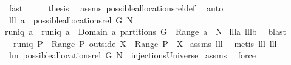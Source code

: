 \begin{isabellebody}
\ fast\isanewline
\ \ \isamarkupfalse%
\ \isamarkupfalse%
\ {\isacharquery}thesis\ \isamarkupfalse%
\ assms{\isacharparenleft}{}{\isacharparenright}\ possible{\isacharunderscore}allocations{\isacharunderscore}rel{\isacharunderscore}def\ \isamarkupfalse%
\ auto\isanewline
{}\isamarkupfalse%
%
\endisatagproof
{\isafoldproof}%
%
\isadelimproof
\isanewline
%
\endisadelimproof
\isanewline
{}\isamarkupfalse%
\ lll{}{}{\isacharcolon}\ {\isachardoublequoteopen}a\ {\isasymin}\ possible{\isacharunderscore}allocations{\isacharunderscore}rel\ G\ N\ {\isasymlongleftrightarrow}\isanewline
runiq\ a\ {\isacharampersand}\ runiq\ {\isacharparenleft}a{\isasyminverse}{\isacharparenright}\ {\isacharampersand}\ {\isacharparenleft}Domain\ a{\isacharparenright}\ partitions\ G\ {\isacharampersand}\ Range\ a\ {\isasymsubseteq}\ N{\isachardoublequoteclose}\isanewline
%
\isadelimproof
%
\endisadelimproof
%
\isatagproof
{}\isamarkupfalse%
\ lll{}{}a\ lll{}{}b\ \isamarkupfalse%
\ blast%
\endisatagproof
{\isafoldproof}%
%
\isadelimproof
\isanewline
%
\endisadelimproof
\isanewline
{}\isamarkupfalse%
\ \ {\isachardoublequoteopen}runiq\ {\isacharparenleft}P{\isacharcircum}{\isacharminus}{}{\isacharparenright}{\isachardoublequoteclose}\ \ {\isachardoublequoteopen}Range\ {\isacharparenleft}P\ outside\ X{\isacharparenright}\ {\isasyminter}\ Range\ {\isacharparenleft}P\ {\isacharbar}{\isacharbar}\ X{\isacharparenright}{\isacharequal}{\isacharbraceleft}{\isacharbraceright}{\isachardoublequoteclose}\isanewline
%
\isadelimproof
%
\endisadelimproof
%
\isatagproof
{}\isamarkupfalse%
\ assms\ lll{}{}\ \isamarkupfalse%
\ {\isacharparenleft}metis\ lll{}{}\ lll{}{}{\isacharparenright}%
\endisatagproof
{\isafoldproof}%
%
\isadelimproof
\isanewline
%
\endisadelimproof
\isanewline
{}\isamarkupfalse%
\ lm{}{}{\isacharcolon}\ {\isachardoublequoteopen}possible{\isacharunderscore}allocations{\isacharunderscore}rel{\isacharprime}\ G\ N\ {\isasymsubseteq}\ injectionsUniverse{\isachardoublequoteclose}\isanewline
%
\isadelimproof
%
\endisadelimproof
%
\isatagproof
{}\isamarkupfalse%
\ assms\ \isamarkupfalse%
\ force%
\endisatagproof
{\isafoldproof}%
%
\isadelimproof

\end{isabellebody}
